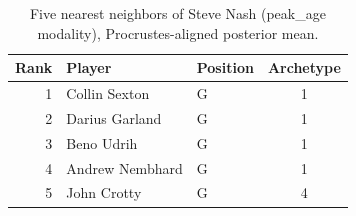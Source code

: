 \begin{table}[htbp]
  \centering\small
  \begin{tabular}{rllc}
    \toprule
    Rank & Player & Position & Archetype \\
    \midrule
    1 & Collin Sexton & G & 1 \\
    2 & Darius Garland & G & 1 \\
    3 & Beno Udrih & G & 1 \\
    4 & Andrew Nembhard & G & 1 \\
    5 & John Crotty & G & 4 \\
    \bottomrule
  \end{tabular}
  \caption{Five nearest neighbors of Steve Nash (peak_age modality), Procrustes-aligned posterior mean.}
  \label{tab:Steve_Nash_neighbors_peak_age}
\end{table}

